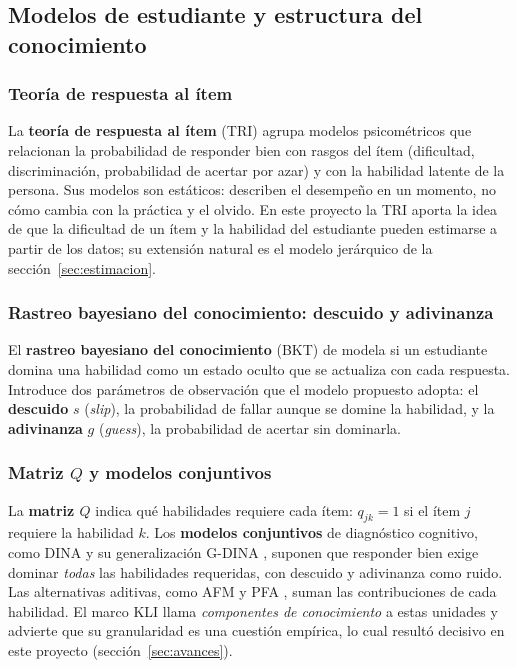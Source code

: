\documentclass[12pt]{article}
\theoremstyle{definition}
\begin{document}
\subsection{Modelos de estudiante y estructura del conocimiento}

\subsubsection{Teoría de respuesta al ítem}

La \textbf{teoría de respuesta al ítem} (TRI) agrupa modelos psicométricos que relacionan la probabilidad de responder bien con rasgos del ítem (dificultad, discriminación, probabilidad de acertar por azar) y con la habilidad latente de la persona. Sus modelos son estáticos: describen el desempeño en un momento, no cómo cambia con la práctica y el olvido. En este proyecto la TRI aporta la idea de que la dificultad de un ítem y la habilidad del estudiante pueden estimarse a partir de los datos; su extensión natural es el modelo jerárquico de la sección~\ref{sec:estimacion}.

\subsubsection{Rastreo bayesiano del conocimiento: descuido y adivinanza}

El \textbf{rastreo bayesiano del conocimiento} (BKT) de \citet{corbett1994} modela si un estudiante domina una habilidad como un estado oculto que se actualiza con cada respuesta. Introduce dos parámetros de observación que el modelo propuesto adopta: el \textbf{descuido} $s$ (\emph{slip}), la probabilidad de fallar aunque se domine la habilidad, y la \textbf{adivinanza} $g$ (\emph{guess}), la probabilidad de acertar sin dominarla.

\subsubsection{Matriz $Q$ y modelos conjuntivos}

La \textbf{matriz $Q$} \citep{tatsuoka1983} indica qué habilidades requiere cada ítem: $q_{jk}=1$ si el ítem $j$ requiere la habilidad $k$. Los \textbf{modelos conjuntivos} de diagnóstico cognitivo, como DINA \citep{junker2001} y su generalización G-DINA \citep{delatorre2011}, suponen que responder bien exige dominar \emph{todas} las habilidades requeridas, con descuido y adivinanza como ruido. Las alternativas aditivas, como AFM \citep{cen2006} y PFA \citep{pavlik2009}, suman las contribuciones de cada habilidad. El marco KLI \citep{koedinger2012} llama \emph{componentes de conocimiento} a estas unidades y advierte que su granularidad es una cuestión empírica, lo cual resultó decisivo en este proyecto (sección~\ref{sec:avances}).
\end{document}
